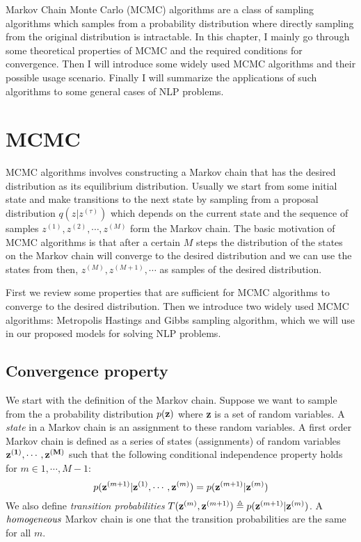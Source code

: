 Markov Chain Monte Carlo (MCMC) algorithms are a class of sampling algorithms which samples from a probability distribution where directly sampling
from the original distribution is intractable. 
In this chapter, I mainly go through some theoretical properties of MCMC and the required conditions for convergence.
Then I will introduce some widely used MCMC algorithms and their possible usage scenario. Finally I will summarize the applications of such algorithms to 
some general cases of NLP problems.
\section{MCMC}
MCMC algorithms involves constructing a Markov chain that has the desired distribution as its equilibrium distribution.
Usually we start from some initial state and make transitions to the next state by sampling from a proposal distribution $q(z|z^{(\tau)})$ which depends on
the current state and the sequence of samples $z^{(1)}, z^{(2)}, \cdots, z^{(M)}$ form the Markov chain.
The basic motivation of MCMC algorithms is that after a certain $M$ steps the distribution of the states on the Markov chain will converge to
the desired distribution and we can use the states from then, $z^{(M)}, z^{(M+1)}, \cdots$ as samples of the desired distribution.


First we review some properties that are sufficient for MCMC algorithms to converge to the desired distribution. Then we introduce two widely used MCMC algorithms: Metropolis Hastings and Gibbs sampling algorithm, which we will use 
in our proposed models for solving NLP problems.
\subsection{Convergence property}
We start with the definition of the Markov chain.
Suppose we want to sample from the a probability distribution $p({\bf z})$ where {\bf z} is a set of random variables.
A {\it state} in a Markov chain is an assignment to these random variables.
A first order Markov chain is defined as a series of states (assignments) of random variables ${\bf z^{(1)}},\cdots,{\bf z^{(M)}}$ such that the following conditional independence property holds for $m \in {1,\cdots,M-1}$:
$$p({\bf z}^{(m+1)}|{\bf z}^{(1)}, \cdots, {\bf z}^{(m)})=p({\bf z}^{(m+1)}|{\bf z}^{(m)})$$
We also define {\it transition probabilities} $T({\bf z}^{(m)},{\bf z}^{(m+1)})\triangleq p({\bf z}^{(m+1)}|{\bf z}^{(m)})$. A ${\it homogeneous}$ Markov chain is one that
the transition probabilities are the same for all $m$.


